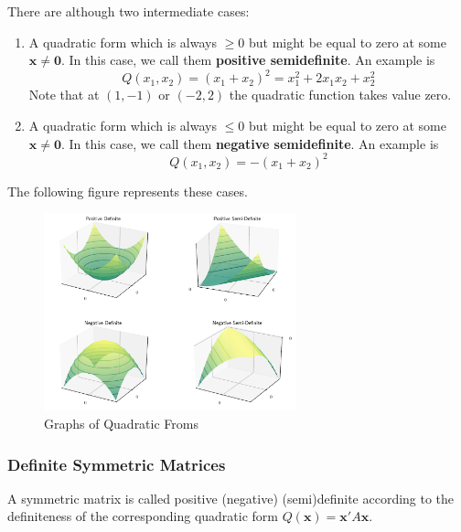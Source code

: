 \documentclass[a4paper,11pt]{article}
\theoremstyle{definition}
\theoremstyle{plain}
\begin{document}
There are although two intermediate cases:

\begin{enumerate}
\def\labelenumi{\arabic{enumi}.}
\item
  A quadratic form which is always \(\geq 0\) but might be equal to zero
  at some \(\mathbf{x} \neq \mathbf{0}\). In this case, we call them
  \textbf{positive semidefinite}. An example is \[
  Q(x_1, x_2) = (x_1 + x_2)^2 = x_1^2 + 2x_1x_2 + x_2^2
  \] Note that at \((1, -1)\) or \((-2, 2)\) the quadratic function
  takes value zero.
\item
  A quadratic form which is always \(\leq 0\) but might be equal to zero
  at some \(\mathbf{x} \neq \mathbf{0}\). In this case, we call them
  \textbf{negative semidefinite}. An example is \[
  Q(x_1, x_2) = -(x_1 + x_2)^2
  \]
\end{enumerate}

The following figure represents these cases.

    \begin{figure}[htbp]
    	\centering 
    		\includegraphics[width = 0.65\textwidth]{Ch4_files/Ch4_21_0.pdf}
    		\caption{Graphs of Quadratic Froms}
    		\label{fig:quad_forms}
    \end{figure}
    
    \subsubsection{Definite Symmetric
Matrices}\label{definite-symmetric-matrices}

A symmetric matrix is called positive (negative) (semi)definite
according to the definiteness of the corresponding quadratic form
\(Q(\mathbf{x}) = \mathbf{x}'A\mathbf{x}\).
\end{document}
